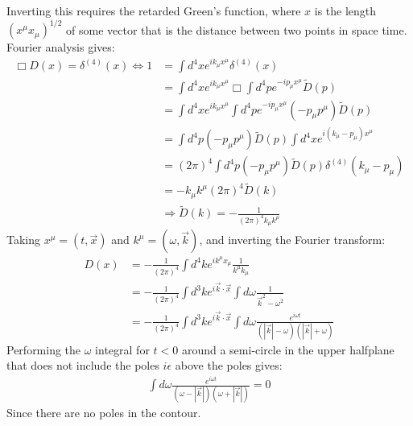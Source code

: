 \documentclass[12pt,a4]{article}
\begin{document}
\begin{enumerate}
\begin{enumerate}
        Inverting this requires the retarded Green's function, where $x$ is the length $(x^\mu x_\mu)^{1/2}$ of some vector that is the distance between two points in space time.
        Fourier analysis gives:
        \begin{align*}
          \Box D (x) = \delta^{(4)} (x) \Leftrightarrow  1  &= \int d^4x e^{ik_\mu x^{\mu}} \delta^{(4)} (x) \\
                                                            &= \int d^4x e^{ik_\mu x^{\mu}} \Box \int d^4 p e^{-ip_\mu x^{\mu}} \tilde{D}(p)\\
                                                            &= \int d^4x e^{ik_\mu x^{\mu}} \int d^4 p e^{-ip_\mu x^{\mu}} (-p_\mu p^\mu) \tilde{D}(p)\\
                                                            &= \int d^4p (-p_\mu p^\mu) \tilde{D}(p)\int d^4x e^{i(k_\mu - p_\mu) x^{\mu}} \\
                                                            &= (2 \pi)^4\int d^4p (-p_\mu p^\mu) \tilde{D}(p)\delta^{(4)}(k_\mu - p_\mu) \\
                                                            &= -k_\mu k^\mu (2 \pi)^4 \tilde{D}(k)\\
                                                            &\Rightarrow \tilde{D}(k) =- \frac{1}{(2 \pi)^4k_\mu k^\mu }
        \end{align*}
        Taking $x^\mu = (t, \vec{x})$ and $k^\mu = (\omega, \vec{k})$, and inverting the Fourier transform:
        \begin{align*}
          D (x) &= - \frac{1}{(2 \pi)^4}\int d^4 k e^{i k^\mu x_\mu} \frac{1}{k^\mu k_\mu}\\
                &= - \frac{1}{(2 \pi)^4}\int d^3 k e^{i \vec{k} \cdot \vec{x}} \int d \omega \frac{1}{\vec{k}^2 - \omega^2}\\
                &= - \frac{1}{(2 \pi)^4}\int d^3 k e^{i \vec{k} \cdot \vec{x}} \int d \omega \frac{e^{i \omega t}}{(|\vec{k}| - \omega)(|\vec{k}| + \omega)}
        \end{align*}
        Performing the $\omega$ integral for $t < 0$ around a semi-circle in the upper halfplane that does not include the poles $i \epsilon$ above the poles gives:
        \begin{align*}
          \int d \omega \frac{e^{i \omega t}}{(\omega - |\vec{k}|)( \omega + |\vec{k}|)} = 0
        \end{align*}
        Since there are no poles in the contour.

\end{enumerate}
\end{enumerate}
\end{document}
